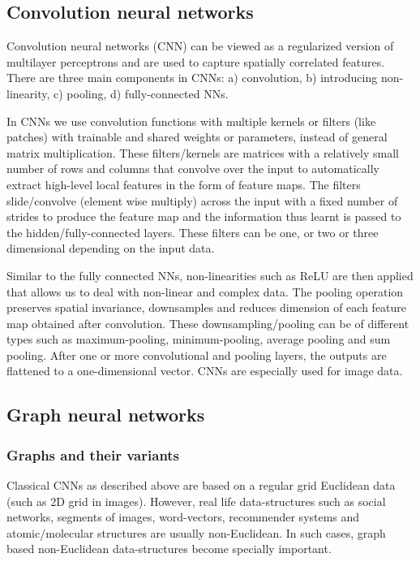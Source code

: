 \documentclass[pdflatex,sn-mathphys]{sn-jnl}%
\theoremstyle{thmstyleone}%
\theoremstyle{thmstyletwo}%
\theoremstyle{thmstylethree}%
\begin{document}
\subsection{Convolution neural networks}\label{sec:cnn}
Convolution neural networks (CNN) \cite{lecun1995convolutional}  can be viewed as a regularized version of multilayer perceptrons and are used to capture spatially correlated features. There are three main components in CNNs: a) convolution, b) introducing non-linearity, c) pooling, d) fully-connected NNs. 

In CNNs we use convolution functions with multiple kernels or filters (like patches) with trainable and shared weights or parameters, instead of general matrix multiplication. These filters/kernels are matrices with a relatively small number of rows and columns that convolve over the input to automatically extract high-level local features in the form of feature maps. The filters slide/convolve (element wise multiply) across the input with a fixed number of strides to produce the feature map and the information thus learnt is passed to the hidden/fully-connected layers. These filters can be one, or two or three dimensional depending on the input data. 

Similar to the fully connected NNs, non-linearities such as ReLU are then applied that allows us to deal with non-linear and complex data. The pooling operation preserves spatial invariance, downsamples and reduces dimension of each feature map obtained after convolution. These downsampling/pooling can be of different types such as maximum-pooling, minimum-pooling, average pooling and sum pooling. 
After one or more convolutional and pooling layers, the outputs are flattened to a one-dimensional vector. CNNs are especially used for image data.

\subsection{Graph neural networks}\label{sec:gnn}

\subsubsection{Graphs and their variants}
Classical CNNs as described above are based on a regular grid Euclidean data (such as 2D grid in images). However, real life data-structures such as social networks, segments of images, word-vectors, recommender systems and atomic/molecular structures are usually non-Euclidean. In such cases, graph based non-Euclidean data-structures become specially important.
\end{document}

